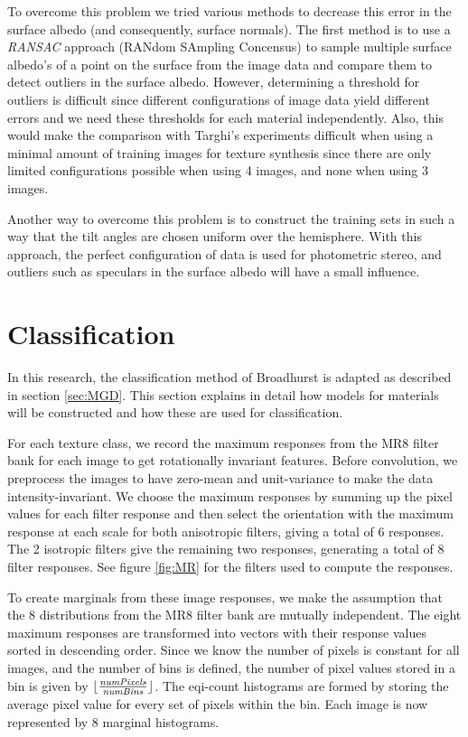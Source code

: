 To overcome this problem we tried various methods to decrease this error in the surface albedo (and consequently, surface normals). The first method is to use a {\it RANSAC} approach (RANdom SAmpling Concensus) to sample multiple surface albedo's of a point on the surface from the image data and compare them to detect outliers in the surface albedo. However, determining a threshold for outliers is difficult since different configurations of image data yield different errors and we need these thresholds for each material independently. Also, this would make the comparison with Targhi's experiments difficult when using a minimal amount of training images for texture synthesis since there are only limited configurations possible when using 4 images, and none when using 3 images. 

Another way to overcome this problem is to construct the training sets in such a way that the tilt angles are chosen uniform over the hemisphere. With this approach, the perfect configuration of data is used for photometric stereo, and outliers such as speculars in the surface albedo will have a small influence.

\section{Classification}\label{sec:Classification}

In this research, the classification method of Broadhurst is adapted as described in section \ref{sec:MGD}. This section explains in detail how models for materials will be constructed and how these are used for classification.

For each texture class, we record the maximum responses from the MR8 filter bank for each image to get rotationally invariant features. Before convolution, we preprocess the images to have zero-mean and unit-variance to make the data intensity-invariant. We choose the maximum responses by summing up the pixel values for each filter response and then select the orientation with the maximum response at each scale for both anisotropic filters, giving a total of 6 responses. The 2 isotropic filters give the remaining two responses, generating a total of 8 filter responses. See figure \ref{fig:MR} for the filters used to compute the responses.

To create marginals from these image responses, we make the assumption that the 8 distributions from the MR8 filter bank are mutually independent. The eight maximum responses are transformed into vectors with their response values sorted in descending order. Since we know the number of pixels is constant for all images, and the number of bins is defined, the number of pixel values stored in a bin is given by $\lfloor \frac{{\it numPixels}}{{\it numBins}} \rfloor$. The eqi-count histograms are formed by storing the average pixel value for every set of pixels within the bin. Each image is now represented by 8 marginal histograms.

